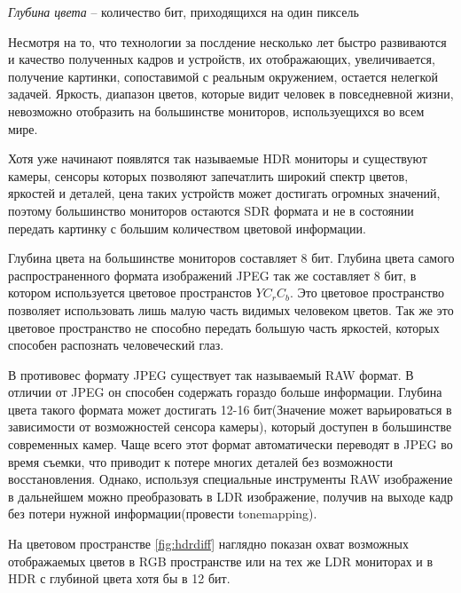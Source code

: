 \textit{Глубина цвета} -- количество бит, приходящихся на один пиксель 
    
    Несмотря на то, что технологии за послдение несколько лет быстро развиваются и качество полученных кадров и устройств, их отображающих, увеличивается, получение картинки, сопоставимой с реальным окружением, остается нелегкой задачей. Яркость, диапазон цветов, которые видит человек в повседневной жизни, невозможно отобразить на большинстве мониторов, используещихся во всем мире. 

    Хотя уже начинают появлятся так называемые HDR мониторы и существуют камеры, сенсоры которых позволяют запечатлить широкий спектр цветов, яркостей и деталей, цена таких устройств может достигать огромных значений, поэтому большинство мониторов остаются SDR формата и не в состоянии передать картинку с большим количеством цветовой информации.

    Глубина цвета на большинстве мониторов составляет 8 бит. Глубина цвета самого распространенного формата изображений JPEG так же составляет 8 бит, в котором используется цветовое пространстов $YC_rC_b$. Это цветовое пространство позволяет использовать лишь малую часть видимых человеком цветов. Так же это цветовое пространство не способно передать большую часть яркостей, которых способен распознать человеческий глаз.

    В противовес формату JPEG существует так называемый RAW формат. В отличии от JPEG он способен содержать гораздо больше информации. Глубина цвета такого формата может достигать 12-16 бит(Значение может варьироваться в зависимости от возможностей сенсора камеры), который доступен в большинстве современных камер. Чаще всего этот формат автоматически переводят в JPEG во время съемки, что приводит к потере многих деталей без возможности восстановления. Однако, используя специальные инструменты RAW изображение в дальнейшем можно преобразовать в LDR изображение, получив на выходе кадр без потери нужной информации(провести tonemapping).

    На цветовом пространстве \ref{fig:hdrdiff} наглядно показан охват возможных отображаемых цветов в RGB пространстве или на тех же LDR мониторах и в HDR с глубиной цвета хотя бы в 12 бит.

\begin{figure}[ht!]
\end{figure}

